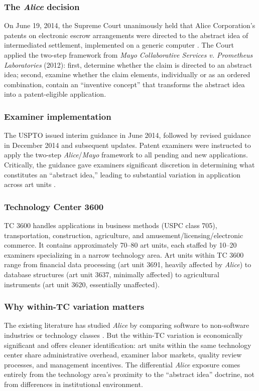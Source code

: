 \documentclass[12pt]{article}
\begin{document}
\subsubsection*{The \textit{Alice} decision} On June 19, 2014, the Supreme Court unanimously held that Alice Corporation's patents on electronic escrow arrangements were directed to the abstract idea of intermediated settlement, implemented on a generic computer \citep{alice2014}. The Court applied the two-step framework from \textit{Mayo Collaborative Services v. Prometheus Laboratories} (2012): first, determine whether the claim is directed to an abstract idea; second, examine whether the claim elements, individually or as an ordered combination, contain an ``inventive concept'' that transforms the abstract idea into a patent-eligible application.

\subsubsection*{Examiner implementation} The USPTO issued interim guidance in June 2014, followed by revised guidance in December 2014 and subsequent updates. Patent examiners were instructed to apply the two-step \textit{Alice}/\textit{Mayo} framework to all pending and new applications. Critically, the guidance gave examiners significant discretion in determining what constitutes an ``abstract idea,'' leading to substantial variation in application across art units \citep{lemley2020}.

\subsubsection*{Technology Center 3600} TC 3600 handles applications in business methods (USPC class 705), transportation, construction, agriculture, and amusement/licensing/electronic commerce. It contains approximately 70--80 art units, each staffed by 10--20 examiners specializing in a narrow technology area. Art units within TC 3600 range from financial data processing (art unit 3691, heavily affected by \textit{Alice}) to database structures (art unit 3637, minimally affected) to agricultural instruments (art unit 3620, essentially unaffected).

\subsubsection*{Why within-TC variation matters} The existing literature has studied \textit{Alice} by comparing software to non-software industries \citep{caskurlu2022} or technology classes \citep{galasso2018}. But the within-TC variation is economically significant and offers cleaner identification: art units within the same technology center share administrative overhead, examiner labor markets, quality review processes, and management incentives. The differential \textit{Alice} exposure comes entirely from the technology area's proximity to the ``abstract idea'' doctrine, not from differences in institutional environment.
\end{document}
